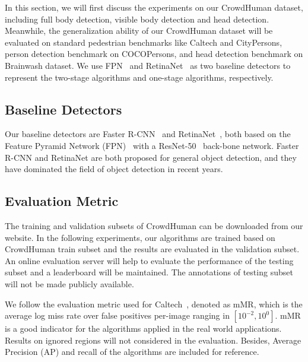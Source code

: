 \documentclass[10pt,twocolumn,letterpaper]{article}
\begin{document}
In this section, we will first discuss the experiments on our CrowdHuman dataset, including full body detection, visible body detection and head detection. Meanwhile, the generalization ability of our CrowdHuman dataset will be evaluated on standard pedestrian benchmarks like Caltech and CityPersons, person detection benchmark on COCOPersons, and head detection benchmark on Brainwash dataset. We use FPN~\cite{lin2017feature} and RetinaNet~\cite{lin2017focal} as two baseline detectors to represent the two-stage algorithms and one-stage algorithms, respectively. 

\subsection{Baseline Detectors}
Our baseline detectors are Faster R-CNN~\cite{ren2015faster} and RetinaNet~\cite{lin2017focal}, both based on the Feature Pyramid Network (FPN)~\cite{lin2017feature} with a ResNet-50~\cite{he2016deep} back-bone network. Faster R-CNN and RetinaNet are both proposed for general object detection, and they have dominated the field of object detection in recent years. 



\subsection{Evaluation Metric}
The training and validation subsets of CrowdHuman can be downloaded from our website. In the following experiments, our algorithms are trained based on CrowdHuman train subset and the results are evaluated in the validation subset.  An online evaluation server will help to evaluate the performance of the testing subset and a leaderboard will be maintained. The annotations of testing subset will not be made publicly available.

We follow the evaluation metric used for Caltech~\cite{dollar2009pedestrian}, denoted as mMR, which is the average log miss rate over false positives per-image ranging in $\left[ 10^{-2}, 10^0\right]$. mMR is a good indicator for the algorithms applied in the real world applications. Results on ignored regions will not considered in the evaluation. Besides, Average Precision (AP) and recall of the algorithms are included for reference.
\end{document}
